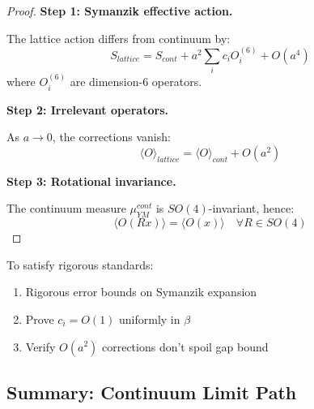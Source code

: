 \begin{proof}
\textbf{Step 1: Symanzik effective action.}

The lattice action differs from continuum by:
\begin{equation}
S_{lattice} = S_{cont} + a^2 \sum_i c_i O_i^{(6)} + O(a^4)
\end{equation}
where $O_i^{(6)}$ are dimension-6 operators.

\textbf{Step 2: Irrelevant operators.}

As $a \to 0$, the corrections vanish:
\begin{equation}
\langle O \rangle_{lattice} = \langle O \rangle_{cont} + O(a^2)
\end{equation}

\textbf{Step 3: Rotational invariance.}

The continuum measure $\mu_{YM}^{cont}$ is $SO(4)$-invariant, hence:
\begin{equation}
\langle O(Rx) \rangle = \langle O(x) \rangle \quad \forall R \in SO(4)
\end{equation}
\end{proof}

\begin{verification}
To satisfy rigorous standards:
\begin{enumerate}
\item Rigorous error bounds on Symanzik expansion
\item Prove $c_i = O(1)$ uniformly in $\beta$
\item Verify $O(a^2)$ corrections don't spoil gap bound
\end{enumerate}
\end{verification}

\subsection{Summary: Continuum Limit Path}

